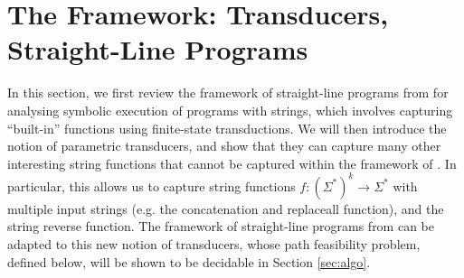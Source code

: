 
\section{The Framework: Transducers, Straight-Line Programs}
\label{sec:framework}

In this section, we first review the framework of straight-line programs from
\cite{LB16} for analysing symbolic execution of programs with strings, which
involves capturing ``built-in'' functions using finite-state transductions.
We will then introduce the notion of parametric transducers, and show that
they can capture many other interesting string functions that cannot be captured
within the framework of \cite{LB16}. In particular, this allows us to capture
string functions $f: (\Sigma^*)^k \to \Sigma^*$ with multiple input strings
(e.g. the concatenation and replaceall function), and the string reverse function. 
The framework of straight-line programs from \cite{LB16} can be adapted
to this new notion of transducers, whose path feasibility problem, defined below, will be shown
to be decidable in Section \ref{sec:algo}.



